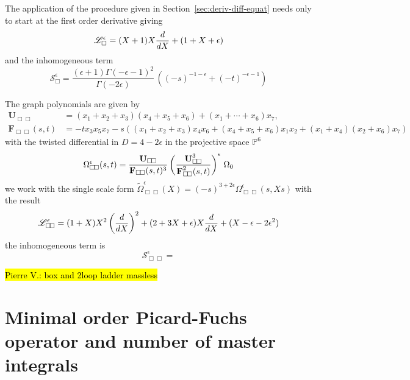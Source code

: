 \documentclass[a4paper,12pt]{article}
\numberwithin{equation}{section}
\numberwithin{figure}{section}
\newcommand{\pvnote}[1]{\sethlcolor{bubblegum} \protect\hl{Pierre V.: #1} \sethlcolor{yellow}}
\begin{document}
The application of the procedure given in
Section~\ref{sec:deriv-diff-equat} needs only to start at the first
order derivative giving
\begin{equation}\label{e:PFBox}
  \mathscr{L}_\Box^\epsilon= (X+1) X {d\over dX}+(1+X+\epsilon)  
\end{equation}
and the inhomogeneous term
\begin{equation}\label{e:SourceBox}
  \mathscr{S}_\Box^\epsilon=\frac{(\epsilon +1)\Gamma (-\epsilon -1)^2 }{\Gamma
   (-2 \epsilon )}  \, \left( (-s)^{-1-\epsilon }+(-t)^{-\epsilon -1}\right)
\end{equation}


The graph polynomials are given by
\begin{align}
  \label{e:DoubleBoxgraphpolynomials}
  \textbf{U}_{\Box\!\Box}&=(x_1+x_2+x_3)(x_4+x_5+x_6)+(x_1+\cdots+x_6)x_7,\\
\nonumber  \textbf{F}_{\Box\!\Box}(s,t)&=-t x_3x_5x_7-s\left( (x_1+x_2+x_3) x_4x_6+(x_4+x_5+x_6)x_1x_2+(x_1+x_4)(x_2+x_6)x_7\right)
\end{align}
with the twisted differential in $D=4-2\epsilon$ in the projective
space $\mathbb P^6$
\begin{equation}\label{e:OmegaBox}
  \Omega_{\Box\!\Box}^\epsilon(s,t)=   {\textbf{U}_{\Box\!\Box}  \over
    \textbf{F}_{\Box\!\Box}(s,t)^{3}}\left(\textbf{U}_{\Box\!\Box}^3\over \textbf{F}^2_{\Box\!\Box}(s,t)\right)^\epsilon\,\Omega_0
\end{equation}
we work with the single scale form $\tilde
\Omega_{\Box\!\Box}^\epsilon(X)=(-s)^{3+2\epsilon}
\Omega_{\Box\!\Box}^\epsilon(s,Xs)$
with the result
\begin{equation}\label{e:PF2box}
  \mathscr{L}_{\Box\!\Box}^\epsilon=(1+X)X^2 \left(d\over
    dX\right)^2+(2+3X+\epsilon) X{d\over dX}+(X-\epsilon-2\epsilon^2)  
\end{equation}
the inhomogeneous term is
\begin{equation}\label{e:Source2box}
  \mathscr{S}_{\Box\!\Box}^\epsilon=
\end{equation}


\pvnote{box and 2loop ladder massless}
\section{Minimal order Picard-Fuchs operator and number of master integrals}
\end{document}
